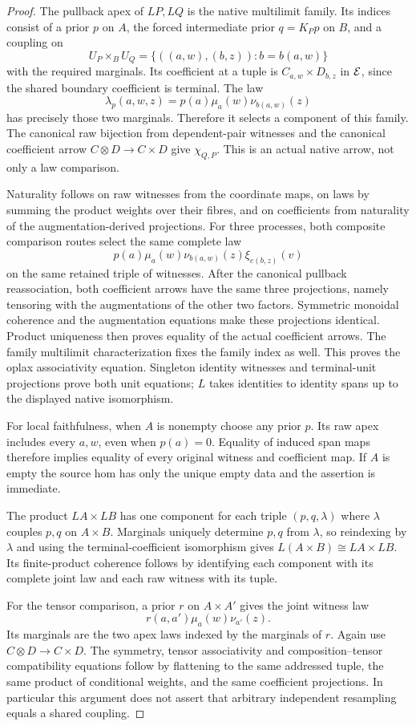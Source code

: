 \documentclass[11pt]{article}
\begin{document}
\begin{proof}
The pullback apex of $LP,LQ$ is the native multilimit family. Its indices consist of a prior $p$ on $A$, the forced intermediate prior $q=K_Pp$ on $B$, and a coupling on
\[
 U_P\times_B U_Q=\{((a,w),(b,z)):b=b(a,w)\}
\]
with the required marginals. Its coefficient at a tuple is $C_{a,w}\times D_{b,z}$ in $\mathcal E$, since the shared boundary coefficient is terminal. The law
\[
 \lambda_p(a,w,z)=p(a)\mu_a(w)\nu_{b(a,w)}(z)
\]
has precisely those two marginals. Therefore it selects a component of this family. The canonical raw bijection from dependent-pair witnesses and the canonical coefficient arrow $C\otimes D\to C\times D$ give $\chi_{Q,P}$. This is an actual native arrow, not only a law comparison.

Naturality follows on raw witnesses from the coordinate maps, on laws by summing the product weights over their fibres, and on coefficients from naturality of the augmentation-derived projections. For three processes, both composite comparison routes select the same complete law
\[
 p(a)\mu_a(w)\nu_{b(a,w)}(z)\xi_{c(b,z)}(v)
\]
on the same retained triple of witnesses. After the canonical pullback reassociation, both coefficient arrows have the same three projections, namely tensoring with the augmentations of the other two factors. Symmetric monoidal coherence and the augmentation equations make these projections identical. Product uniqueness then proves equality of the actual coefficient arrows. The family multilimit characterization fixes the family index as well. This proves the oplax associativity equation. Singleton identity witnesses and terminal-unit projections prove both unit equations; $L$ takes identities to identity spans up to the displayed native isomorphism.

For local faithfulness, when $A$ is nonempty choose any prior $p$. Its raw apex includes every $a,w$, even when $p(a)=0$. Equality of induced span maps therefore implies equality of every original witness and coefficient map. If $A$ is empty the source hom has only the unique empty data and the assertion is immediate.

The product $LA\times LB$ has one component for each triple $(p,q,\lambda)$ where $\lambda$ couples $p,q$ on $A\times B$. Marginals uniquely determine $p,q$ from $\lambda$, so reindexing by $\lambda$ and using the terminal-coefficient isomorphism gives $L(A\times B)\cong LA\times LB$. Its finite-product coherence follows by identifying each component with its complete joint law and each raw witness with its tuple.

For the tensor comparison, a prior $r$ on $A\times A'$ gives the joint witness law
\[
 r(a,a')\mu_a(w)\nu_{a'}(z).
\]
Its marginals are the two apex laws indexed by the marginals of $r$. Again use $C\otimes D\to C\times D$. The symmetry, tensor associativity and composition--tensor compatibility equations follow by flattening to the same addressed tuple, the same product of conditional weights, and the same coefficient projections. In particular this argument does not assert that arbitrary independent resampling equals a shared coupling.
\end{proof}
\end{document}
